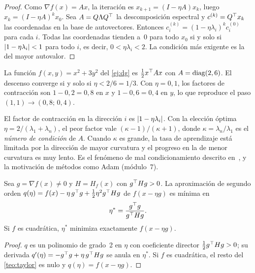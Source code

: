 \begin{proof}
Como $\nabla f(x)=Ax$, la iteración es $x_{k+1}=(I-\eta A)x_k$, luego $x_k=(I-\eta A)^{k}x_0$. Sea $A=Q\Lambda Q^{\top}$ la descomposición espectral y $c^{(k)}=Q^{\top} x_k$ las coordenadas en la base de autovectores. Entonces $c^{(k)}_i=(1-\eta\lambda_i)^{k}c^{(0)}_i$ para cada $i$. Todas las coordenadas tienden a~0 para todo $x_0$ si y solo si $\lvert1-\eta\lambda_i\rvert<1$ para todo $i$, es decir, $0<\eta\lambda_i<2$. La condición más exigente es la del mayor autovalor.
\end{proof}

\begin{ejemplo}\label{ej:dg-cuad}
La función $f(x,y)=x^{2}+3y^{2}$ del \cref{ej:dg} es $\tfrac12x^{\top} Ax$ con $A=\operatorname{diag}(2,6)$. El descenso converge si y solo si $\eta<2/6=1/3$. Con $\eta=0{,}1$, los factores de contracción son $1-0{,}2=0{,}8$ en $x$ y $1-0{,}6=0{,}4$ en $y$, lo que reproduce el paso $(1,1)\to(0{,}8;\,0{,}4)$.
\end{ejemplo}

\begin{observacion}
El factor de contracción en la dirección $i$ es $\lvert1-\eta\lambda_i\rvert$. Con la elección óptima $\eta=2/(\lambda_1+\lambda_n)$, el peor factor vale $(\kappa-1)/(\kappa+1)$, donde $\kappa=\lambda_n/\lambda_1$ es el \emph{número de condición} de $A$. Cuando $\kappa$ es grande, la tasa de aprendizaje está limitada por la dirección de mayor curvatura y el progreso en la de menor curvatura es muy lento. Es el fenómeno de mal condicionamiento descrito en~\cite[§4.2 y §4.3.1]{gbc}, y la motivación de métodos como Adam (módulo~7).
\end{observacion}

\begin{proposicion}\label{prop:paso-optimo}
Sea $g=\nabla f(x)\ne 0$ y $H=H_f(x)$ con $g^{\top} Hg>0$. La aproximación de segundo orden $q(\eta)=f(x)-\eta\,g^{\top} g+\tfrac12\eta^{2}g^{\top} Hg$ de $f(x-\eta g)$ es mínima en
\[
\eta^{*}=\frac{g^{\top} g}{g^{\top} Hg}.
\]
Si $f$ es cuadrática, $\eta^{*}$ minimiza exactamente $f(x-\eta g)$.
\end{proposicion}

\begin{proof}
$q$ es un polinomio de grado~2 en $\eta$ con coeficiente director $\tfrac12 g^{\top} Hg>0$; su derivada $q'(\eta)=-g^{\top} g+\eta\,g^{\top} Hg$ se anula en $\eta^{*}$. Si $f$ es cuadrática, el resto del \cref{teo:taylor} es nulo y $q(\eta)=f(x-\eta g)$.
\end{proof}

